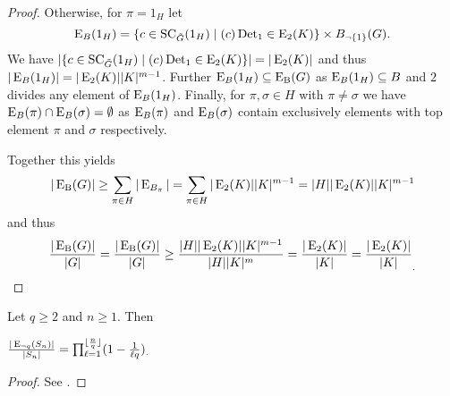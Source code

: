 \begin{proof}
\begin{sloppypar}
Otherwise, for $\pi=1_H$ let
\[\operatorname{E}_{B}(1_H)=\{c\in \operatorname{SC}_{\tilde{G}}(1_H) \mid (c)\operatorname{Det}_1 \in \operatorname{E}_2(K)\}\times B_{\neg \{1\}}(G). \] 
We have $|\{c\in \operatorname{SC}_{\tilde{G}}(1_H) \mid (c)\operatorname{Det}_1 \in \operatorname{E}_2(K)\}|=|\operatorname{E}_2(K)|$
and thus \mbox{$|\operatorname{E}_{B}(1_H)|=|\operatorname{E}_2(K)||K|^{m-1}$}.
Further $\operatorname{E}_{B}(1_H) \subseteq \operatorname{E_{B}}(G)$ as $\operatorname{E}_{B}(1_H) \subseteq B$ and $2$ divides any element of $\operatorname{E}_{B}(1_H)$.
Finally, for $\pi,\sigma\in H$ with $\pi \neq \sigma$ we have \mbox{$\operatorname{E}_{B}(\pi)\cap\operatorname{E}_{B}(\sigma)=\emptyset$} as $\operatorname{E}_{B}(\pi)$ and $\operatorname{E}_{B}(\sigma)$ contain exclusively elements with top element $\pi$ and $\sigma$ respectively.

Together this yields \[|\operatorname{E_{B}}(G)|\geq\sum_{\pi\in H}|\operatorname{E}_{B_\pi}|=\sum_{\pi\in H}|\operatorname{E}_2(K)||K|^{m-1}=|H||\operatorname{E}_2(K)||K|^{m-1}\]
and thus
\[\frac{|\operatorname{E_{B}}(G)|}{|G|}=\frac{|\operatorname{E_{B}}(G)|}{|G|}\geq\frac{|H||\operatorname{E}_2(K)||K|^{m-1}}{|H||K|^{m}}=\frac{|\operatorname{E}_2(K)|}{|K|}=\frac{|\operatorname{E}_2(K)|}{|K|}_.\]
\end{sloppypar}
\end{proof}



\begin{thm}\label{engesnabschätzung}
Let $q\geq 2$ and $n\geq 1$. Then

$\frac{|\operatorname{E}_{\neg q}(S_n)|}{|S_n|}=\prod_{\ell=1}^{\lfloor\frac{n}{q}\rfloor}(1-\frac{1}{\ell q})_.$
\end{thm}
\begin{proof}
See \cite[Theorem 2.3 (a),%
p.4]{beals2002permutations}.
\end{proof}


